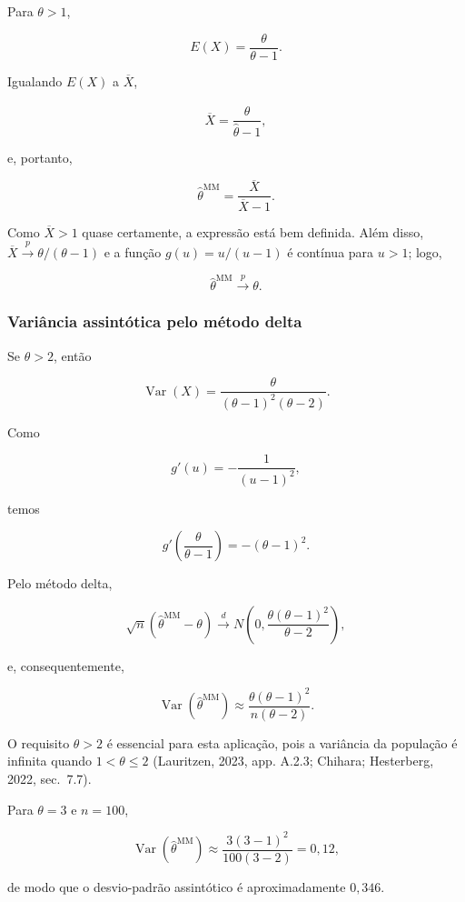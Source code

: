 \documentclass[
  letterpaper,
  DIV=11,
  numbers=noendperiod]{scrreprt}
\begin{document}
Para \(\theta>1\),

\[E(X)=\frac{\theta}{\theta-1}.\]

Igualando \(E(X)\) a \(\overline X\),

\[\overline X=\frac{\widehat\theta}{\widehat\theta-1},\]

e, portanto,

\[\boxed{
\widehat\theta^{\mathrm{MM}}
=\frac{\overline X}{\overline X-1}
}.\]

Como \(\overline X>1\) quase certamente, a expressão está bem definida.
Além disso, \(\overline X\xrightarrow{p}\theta/(\theta-1)\) e a função
\(g(u)=u/(u-1)\) é contínua para \(u>1\); logo,

\[\widehat\theta^{\mathrm{MM}}\xrightarrow{p}\theta.\]

\subsubsection*{Variância assintótica pelo método
delta}\label{variuxe2ncia-assintuxf3tica-pelo-muxe9todo-delta}

Se \(\theta>2\), então

\[\operatorname{Var}(X)
=\frac{\theta}{(\theta-1)^2(\theta-2)}.\]

Como

\[g'(u)=-\frac{1}{(u-1)^2},\]

temos

\[g'\left(\frac{\theta}{\theta-1}\right)=-(\theta-1)^2.\]

Pelo método delta,

\[\sqrt n
(\widehat\theta^{\mathrm{MM}}-\theta)
\xrightarrow{d}
N\left(
0,
\frac{\theta(\theta-1)^2}{\theta-2}
\right),\]

e, consequentemente,

\[\operatorname{Var}(\widehat\theta^{\mathrm{MM}})
\approx
\frac{\theta(\theta-1)^2}{n(\theta-2)}.\]

O requisito \(\theta>2\) é essencial para esta aplicação, pois a
variância da população é infinita quando \(1<\theta\leq2\) (Lauritzen,
2023, app. A.2.3; Chihara; Hesterberg, 2022, sec.~7.7).

Para \(\theta=3\) e \(n=100\),

\[\operatorname{Var}(\widehat\theta^{\mathrm{MM}})
\approx\frac{3(3-1)^2}{100(3-2)}=0{,}12,\]

de modo que o desvio-padrão assintótico é aproximadamente \(0{,}346\).
\end{document}
